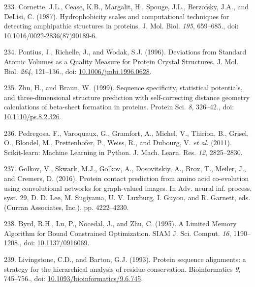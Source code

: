 \documentclass[11pt,a4paper,twoside]{book}
\theoremstyle{definition}
\theoremstyle{definition}
\theoremstyle{remark}
\begin{document}
\hypertarget{ref-Cornette1987}{}
233. Cornette, J.L., Cease, K.B., Margalit, H., Spouge, J.L., Berzofsky,
J.A., and DeLisi, C. (1987). Hydrophobicity scales and computational
techniques for detecting amphipathic structures in proteins. J. Mol.
Biol. \emph{195}, 659--685., doi:
\href{https://doi.org/10.1016/0022-2836(87)90189-6}{10.1016/0022-2836(87)90189-6}.

\hypertarget{ref-Pontius1996}{}
234. Pontius, J., Richelle, J., and Wodak, S.J. (1996). Deviations from
Standard Atomic Volumes as a Quality Measure for Protein Crystal
Structures. J. Mol. Biol. \emph{264}, 121--136., doi:
\href{https://doi.org/10.1006/jmbi.1996.0628}{10.1006/jmbi.1996.0628}.

\hypertarget{ref-Zhu1999}{}
235. Zhu, H., and Braun, W. (1999). Sequence specificity, statistical
potentials, and three-dimensional structure prediction with
self-correcting distance geometry calculations of beta-sheet formation
in proteins. Protein Sci. \emph{8}, 326--42., doi:
\href{https://doi.org/10.1110/ps.8.2.326}{10.1110/ps.8.2.326}.

\hypertarget{ref-Pedregosa2011}{}
236. Pedregosa, F., Varoquaux, G., Gramfort, A., Michel, V., Thirion,
B., Grisel, O., Blondel, M., Prettenhofer, P., Weiss, R., and Dubourg,
V. \emph{et al.} (2011). Scikit-learn: Machine Learning in Python. J.
Mach. Learn. Res. \emph{12}, 2825--2830.

\hypertarget{ref-Golkov2016a}{}
237. Golkov, V., Skwark, M.J., Golkov, A., Dosovitskiy, A., Brox, T.,
Meiler, J., and Cremers, D. (2016). Protein contact prediction from
amino acid co-evolution using convolutional networks for graph-valued
images. In Adv. neural inf. process. syst. 29, D. D. Lee, M. Sugiyama,
U. V. Luxburg, I. Guyon, and R. Garnett, eds. (Curran Associates, Inc.),
pp. 4222--4230.

\hypertarget{ref-Byrd1995}{}
238. Byrd, R.H., Lu, P., Nocedal, J., and Zhu, C. (1995). A Limited
Memory Algorithm for Bound Constrained Optimization. SIAM J. Sci.
Comput. \emph{16}, 1190--1208., doi:
\href{https://doi.org/10.1137/0916069}{10.1137/0916069}.

\hypertarget{ref-Livingstone1993}{}
239. Livingstone, C.D., and Barton, G.J. (1993). Protein sequence
alignments: a strategy for the hierarchical analysis of residue
conservation. Bioinformatics \emph{9}, 745--756., doi:
\href{https://doi.org/10.1093/bioinformatics/9.6.745}{10.1093/bioinformatics/9.6.745}.
\end{document}
